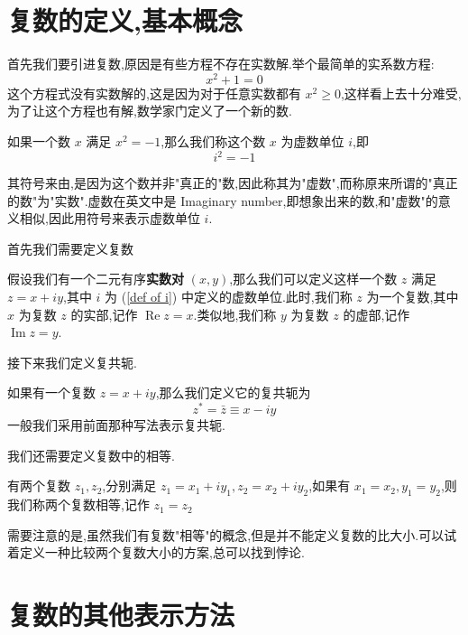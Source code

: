 \documentclass[UTF8]{ctexbook}
\begin{document}
\section{复数的定义,基本概念}

首先我们要引进复数,原因是有些方程不存在实数解.举个最简单的实系数方程:
\[x^2+1=0\]
这个方程式没有实数解的,这是因为对于任意实数都有 $x^2\geqslant0$,这样看上去十分难受,为了让这个方程也有解,数学家门定义了一个新的数.

\begin{definition}
    如果一个数 $x$ 满足 $x^2=-1$,那么我们称这个数 $x$ 为虚数单位 $i$,即
    \begin{equation}
        i^2=-1
        \label{def of i}
    \end{equation}
\end{definition}

其符号来由,是因为这个数并非"真正的"数,因此称其为"虚数",而称原来所谓的"真正的数"为"实数".虚数在英文中是 Imaginary number,即想象出来的数,和"虚数"的意义相似,因此用符号来表示虚数单位 $i$.

首先我们需要定义复数

\begin{definition}
    假设我们有一个二元有序\textbf{实数对} $(x,y)$,那么我们可以定义这样一个数 $z$ 满足 $z=x+iy$,其中 $i$ 为 (\ref{def of i}) 中定义的虚数单位.此时,我们称 $z$ 为一个复数,其中 $x$ 为复数 $z$ 的实部,记作 $\operatorname{Re} z=x$.类似地,我们称 $y$ 为复数 $z$ 的虚部,记作 $\operatorname{Im}z = y$.
\end{definition}

接下来我们定义复共轭.

\begin{definition}
    如果有一个复数 $z=x+iy$,那么我们定义它的复共轭为
    \begin{equation}
        z^* = \bar z \equiv x-iy
    \end{equation}
    一般我们采用前面那种写法表示复共轭.
\end{definition}

我们还需要定义复数中的相等.
\begin{definition}
    有两个复数 $z_1,z_2$,分别满足 $z_1=x_1+iy_1,z_2=x_2+iy_2$,如果有 $x_1=x_2,y_1=y_2$,则我们称两个复数相等,记作 $z_1=z_2$
\end{definition}

需要注意的是,虽然我们有复数"相等"的概念,但是并不能定义复数的比大小.可以试着定义一种比较两个复数大小的方案,总可以找到悖论.

\section{复数的其他表示方法}
\end{document}
